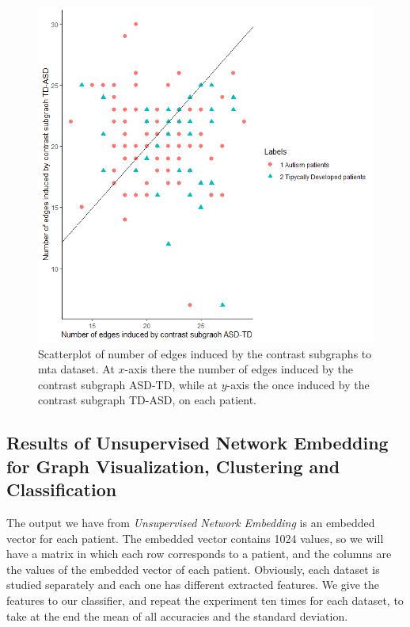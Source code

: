 \begin{figure}[htbp]
	\centering
	\includegraphics[scale=0.5]{Immagini/scatterplot_cs_mta.png}
	\caption{Scatterplot of number of edges induced by the contrast subgraphs to mta dataset. At $x$-axis there the number of edges induced by the contrast subgraph ASD-TD, while at $y$-axis the once induced by the contrast subgraph TD-ASD, on each patient.}
	\label{fig:diagram19}
\end{figure}


\subsection{Results of Unsupervised Network Embedding for Graph Visualization, Clustering and Classification}

The output we have from \textit{Unsupervised Network Embedding} is an embedded vector for each patient. The embedded vector contains 1024 values, so we will have a matrix in which each row corresponds to a patient, and the columns are the values of the embedded vector of each patient. Obviously, each dataset is studied separately and each one has different extracted features. We give the features to our classifier, and repeat the experiment ten times for each dataset, to take at the end the mean of all accuracies and the standard deviation.
\vspace{0.5cm}

